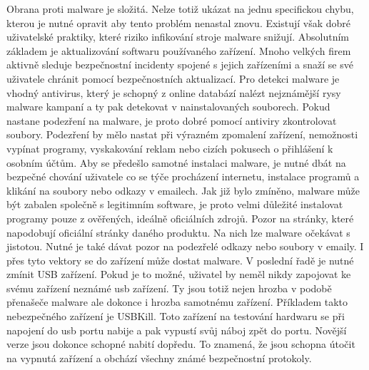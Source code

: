 Obrana proti malware je složitá.
Nelze totiž ukázat na jednu specifickou chybu, kterou je nutné opravit aby tento problém nenastal znovu.
Existují však dobré uživatelské praktiky, které riziko infikování stroje malware snižují.
Absolutním základem je aktualizování softwaru používaného zařízení.
Mnoho velkých firem aktivně sleduje bezpečnostní incidenty spojené s jejich zařízeními a snaží se své uživatele chránit pomocí bezpečnostních aktualizací.
Pro detekci malware je vhodný antivirus, který je schopný z online databází nalézt nejznámější rysy malware kampaní a ty pak detekovat v nainstalovaných souborech.
Pokud nastane podezření na malware, je proto dobré pomocí antiviry zkontrolovat soubory.
Podezření by mělo nastat při výrazném zpomalení zařízení, nemožnosti vypínat programy, vyskakování reklam nebo cizích pokusech o přihlášení k osobním účtům.
Aby se předešlo samotné instalaci malware, je nutné dbát na bezpečné chování uživatele co se týče procházení internetu, instalace programů a klikání na soubory nebo odkazy v emailech.
Jak již bylo zmíněno, malware může být zabalen společně s legitimním software, je proto velmi důležité instalovat programy pouze z ověřených, ideálně oficiálních zdrojů.
Pozor na stránky, které napodobují oficiální stránky daného produktu.
Na nich lze malware očekávat s jistotou.
Nutné je také dávat pozor na podezřelé odkazy nebo soubory v emaily.
I přes tyto vektory se do zařízení může dostat malware.
V poslední řadě je nutné zmínit USB zařízení.
Pokud je to možné, uživatel by neměl nikdy zapojovat ke svému zařízení neznámé usb zařízení.
Ty jsou totiž nejen hrozba v podobě přenašeče malware ale dokonce i hrozba samotnému zařízení.
Příkladem takto nebezpečného zařízení je USBKill\cite{usb_kill}.
Toto zařízení na testování hardwaru se při napojení do usb portu nabije a pak vypustí svůj náboj zpět do portu.
Novější verze jsou dokonce schopné nabití dopředu.
To znamená, že jsou schopna útočit na vypnutá zařízení a obchází všechny známé bezpečnostní protokoly.

